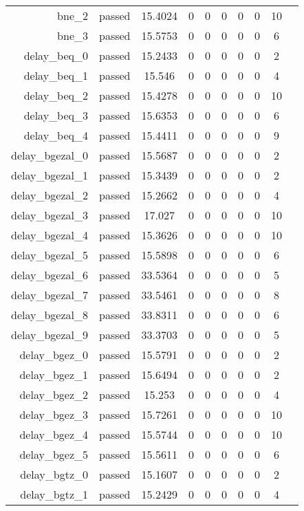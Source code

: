 \begin{longtable}{r|ccccccccc}
    bne\_2 & passed & 15.4024 & 0 & 0 & 0 & 0 & 0 & 10 \\
    bne\_3 & passed & 15.5753 & 0 & 0 & 0 & 0 & 0 & 6 \\
    delay\_beq\_0 & passed & 15.2433 & 0 & 0 & 0 & 0 & 0 & 2 \\
    delay\_beq\_1 & passed & 15.546 & 0 & 0 & 0 & 0 & 0 & 4 \\
    delay\_beq\_2 & passed & 15.4278 & 0 & 0 & 0 & 0 & 0 & 10 \\
    delay\_beq\_3 & passed & 15.6353 & 0 & 0 & 0 & 0 & 0 & 6 \\
    delay\_beq\_4 & passed & 15.4411 & 0 & 0 & 0 & 0 & 0 & 9 \\
    delay\_bgezal\_0 & passed & 15.5687 & 0 & 0 & 0 & 0 & 0 & 2 \\
    delay\_bgezal\_1 & passed & 15.3439 & 0 & 0 & 0 & 0 & 0 & 2 \\
    delay\_bgezal\_2 & passed & 15.2662 & 0 & 0 & 0 & 0 & 0 & 4 \\
    delay\_bgezal\_3 & passed & 17.027 & 0 & 0 & 0 & 0 & 0 & 10 \\
    delay\_bgezal\_4 & passed & 15.3626 & 0 & 0 & 0 & 0 & 0 & 10 \\
    delay\_bgezal\_5 & passed & 15.5898 & 0 & 0 & 0 & 0 & 0 & 6 \\
    delay\_bgezal\_6 & passed & 33.5364 & 0 & 0 & 0 & 0 & 0 & 5 \\
    delay\_bgezal\_7 & passed & 33.5461 & 0 & 0 & 0 & 0 & 0 & 8 \\
    delay\_bgezal\_8 & passed & 33.8311 & 0 & 0 & 0 & 0 & 0 & 6 \\
    delay\_bgezal\_9 & passed & 33.3703 & 0 & 0 & 0 & 0 & 0 & 5 \\
    delay\_bgez\_0 & passed & 15.5791 & 0 & 0 & 0 & 0 & 0 & 2 \\
    delay\_bgez\_1 & passed & 15.6494 & 0 & 0 & 0 & 0 & 0 & 2 \\
    delay\_bgez\_2 & passed & 15.253 & 0 & 0 & 0 & 0 & 0 & 4 \\
    delay\_bgez\_3 & passed & 15.7261 & 0 & 0 & 0 & 0 & 0 & 10 \\
    delay\_bgez\_4 & passed & 15.5744 & 0 & 0 & 0 & 0 & 0 & 10 \\
    delay\_bgez\_5 & passed & 15.5611 & 0 & 0 & 0 & 0 & 0 & 6 \\
    delay\_bgtz\_0 & passed & 15.1607 & 0 & 0 & 0 & 0 & 0 & 2 \\
    delay\_bgtz\_1 & passed & 15.2429 & 0 & 0 & 0 & 0 & 0 & 4 \\

\end{longtable}

